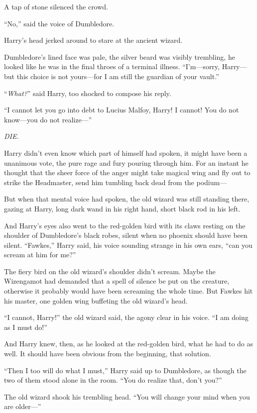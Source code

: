 A tap of stone silenced the crowd.

“No,” said the voice of Dumbledore.

Harry’s head jerked around to stare at the ancient wizard.

Dumbledore’s lined face was pale, the silver beard was visibly trembling, he looked like he was in the final throes of a terminal illness. “I’m—sorry, Harry—but this choice is not yours—for I am still the guardian of your vault.”

“\emph{What?}” said Harry, too shocked to compose his reply.

“I cannot let you go into debt to Lucius Malfoy, Harry! I cannot! You do not know—you do not realize—”

\emph{DIE.}

Harry didn’t even know which part of himself had spoken, it might have been a unanimous vote, the pure rage and fury pouring through him. For an instant he thought that the sheer force of the anger might take magical wing and fly out to strike the Headmaster, send him tumbling back dead from the podium—

But when that mental voice had spoken, the old wizard was still standing there, gazing at Harry, long dark wand in his right hand, short black rod in his left.

And Harry’s eyes also went to the red-golden bird with its claws resting on the shoulder of Dumbledore’s black robes, silent when no phoenix should have been silent. “Fawkes,” Harry said, his voice sounding strange in his own ears, “can you scream at him for me?”

The fiery bird on the old wizard’s shoulder didn’t scream. Maybe the Wizengamot had demanded that a spell of silence be put on the creature, otherwise it probably would have been screaming the whole time. But Fawkes hit his master, one golden wing buffeting the old wizard’s head.

“I cannot, Harry!” the old wizard said, the agony clear in his voice. “I am doing as I must do!”

And Harry knew, then, as he looked at the red-golden bird, what he had to do as well. It should have been obvious from the beginning, that solution.

“Then I too will do what I must,” Harry said up to Dumbledore, as though the two of them stood alone in the room. “You do realize that, don’t you?”

The old wizard shook his trembling head. “You will change your mind when you are older—”

